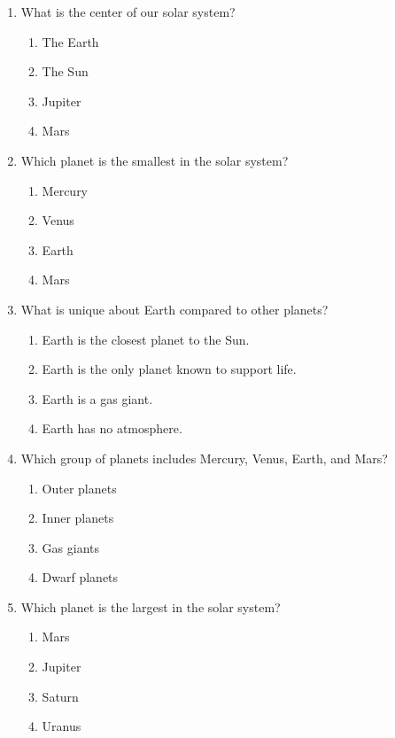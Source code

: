 \documentclass[12pt]{article}
\begin{document}
\begin{enumerate}

    \item What is the center of our solar system?
    \begin{enumerate}[label=\Alph*.]
        \item The Earth
        \item The Sun
        \item Jupiter
        \item Mars
    \end{enumerate}
    \vspace{0.5cm}

    \item Which planet is the smallest in the solar system?
    \begin{enumerate}[label=\Alph*.]
        \item Mercury
        \item Venus
        \item Earth
        \item Mars
    \end{enumerate}
    \vspace{0.5cm}

    \item What is unique about Earth compared to other planets?
    \begin{enumerate}[label=\Alph*.]
        \item Earth is the closest planet to the Sun.
        \item Earth is the only planet known to support life.
        \item Earth is a gas giant.
        \item Earth has no atmosphere.
    \end{enumerate}
    \vspace{0.5cm}

    \item Which group of planets includes Mercury, Venus, Earth, and Mars?
    \begin{enumerate}[label=\Alph*.]
        \item Outer planets
        \item Inner planets
        \item Gas giants
        \item Dwarf planets
    \end{enumerate}
    \vspace{0.5cm}

    \item Which planet is the largest in the solar system?
    \begin{enumerate}[label=\Alph*.]
        \item Mars
        \item Jupiter
        \item Saturn
        \item Uranus
    \end{enumerate}
    \vspace{0.5cm}


\end{enumerate}
\end{document}
